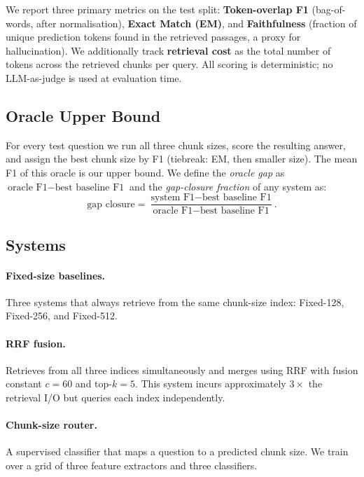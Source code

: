 \documentclass{article}
\begin{document}
We report three primary metrics on the test split:
\textbf{Token-overlap F1} (bag-of-words, after normalisation),
\textbf{Exact Match (EM)}, and
\textbf{Faithfulness} (fraction of unique prediction tokens found in the
retrieved passages, a proxy for hallucination).
We additionally track \textbf{retrieval cost} as the total number of tokens
across the retrieved chunks per query.
All scoring is deterministic; no LLM-as-judge is used at evaluation time.

\subsection{Oracle Upper Bound}

For every test question we run all three chunk sizes, score the resulting
answer, and assign the best chunk size by F1 (tiebreak: EM, then smaller
size). The mean F1 of this oracle is our upper bound.
We define the \emph{oracle gap} as $\text{oracle F1} - \text{best baseline F1}$
and the \emph{gap-closure fraction} of any system as:
\begin{equation}
  \text{gap closure} = \frac{\text{system F1} - \text{best baseline F1}}{\text{oracle F1} - \text{best baseline F1}}.
\end{equation}

\subsection{Systems}

\paragraph{Fixed-size baselines.}
Three systems that always retrieve from the same chunk-size index:
Fixed-128, Fixed-256, and Fixed-512.

\paragraph{RRF fusion.}
Retrieves from all three indices simultaneously and merges using RRF with
fusion constant $c=60$ and top-$k=5$. This system incurs approximately
$3\times$ the retrieval I/O but queries each index independently.

\paragraph{Chunk-size router.}
A supervised classifier that maps a question to a predicted chunk size. We
train over a grid of three feature extractors and three classifiers.
\end{document}
